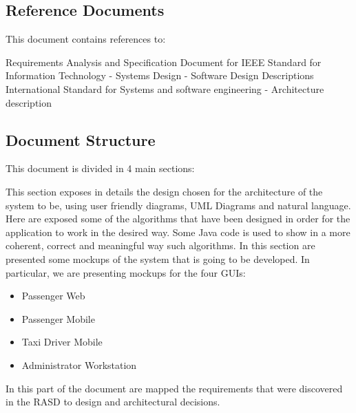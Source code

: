 \subsection{Reference Documents}
This document contains references to:
\begin{itemize}
	  Requirements Analysis and Specification Document for \myTaxiService{}
	 IEEE Standard for Information Technology - Systems Design - Software Design Descriptions
	 International Standard for Systems and software engineering - Architecture description
\end{itemize}

\subsection{Document Structure}
This document is divided in 4 main sections:
\begin{itemize}
	 This section exposes in details the design chosen for the architecture of the system to be, using user friendly diagrams, UML Diagrams and natural language.
	 Here are exposed some of the algorithms that have been designed in order for the application to work in the desired way.
		Some Java code is used to show in a more coherent, correct and meaningful way such algorithms.
	 In this section are presented some mockups of the system that is going to be developed. In particular, we are presenting mockups for the four GUIs:
	\begin{itemize}
		\item Passenger Web
		\item Passenger Mobile
		\item Taxi Driver Mobile
		\item Administrator Workstation
	\end{itemize}
	 In this part of the document are mapped the requirements that were discovered in the RASD to design and architectural decisions.
\end{itemize}
